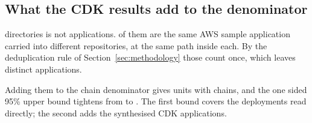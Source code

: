 \subsection{What the CDK results add to the denominator}

\nCdkAnalysed directories is not \nCdkAnalysed applications.
\nCdkSampleCopies of them are the same AWS sample application carried into
\nCdkSampleCopies different repositories, at the same path inside each. By the
deduplication rule of Section~\ref{sec:methodology} those count once, which
leaves \nCdkDistinctApps distinct applications.

Adding them to the chain denominator gives \nChainDenominatorExt units with
\nChainsFound chains, and the one sided 95\% upper bound tightens from
\chainBound to \chainBoundExt. The first bound covers the deployments read
directly; the second adds the synthesised CDK applications.
